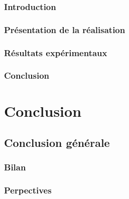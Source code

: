 \documentclass[french]{spimubephdthesis}
\begin{document}
\section{Introduction}

\section{Présentation de la réalisation}

\section{Résultats expérimentaux}

\section{Conclusion}

\part{Conclusion}

\chapter{Conclusion générale}
 
\section{Bilan}

\section{Perpectives}
 
\backmatter
 
 
 
 
 
 
\end{document}
